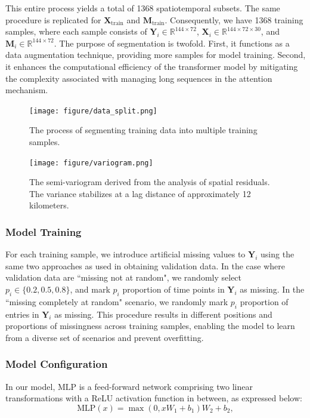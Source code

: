 \documentclass[11pt]{article}
\begin{document}
This entire process yields a total of 1368 spatiotemporal subsets. The same procedure is replicated for $\boldsymbol{X}_{\text{train}}$ and $\boldsymbol{M}_{\text{train}}$. Consequently, we have 1368 training samples, where each sample consists of $\boldsymbol{Y}_i \in \mathbb{R}^{144\times 72}$, $\boldsymbol{X}_i \in \mathbb{R}^{144 \times 72 \times 30}$, and $\boldsymbol{M}_i \in \mathbb{R}^{144 \times 72}$. The purpose of segmentation is twofold. First, it functions as a data augmentation technique, providing more samples for model training. Second, it enhances the computational efficiency of the transformer model by mitigating the complexity associated with managing long sequences in the attention mechanism. 




\begin{figure}
\centering
\texttt{[image: figure/data\_split.png]}
\caption{ The process of segmenting training data into multiple training samples.}
\label{fig: data_split}
\end{figure}

\begin{figure}
\centering
\texttt{[image: figure/variogram.png]}
\caption{The semi-variogram derived from the analysis of spatial residuals. The variance stabilizes at a lag distance of approximately 12 kilometers.}
\label{fig: variogram}
\end{figure}




\subsubsection*{Model Training}
For each training sample, we introduce artificial missing values to $\boldsymbol{Y}_i$ using the same two approaches as used in obtaining validation data. In the case where validation data are ``missing not at random", we randomly select $p_i \in \{0.2, 0.5, 0.8\}$, and mark $p_i$ proportion of time points in $\boldsymbol{Y}_i$ as missing. In the ``missing completely at random" scenario, we randomly mark $p_i$ proportion of entries in $\boldsymbol{Y}_i$ as missing. This procedure results in different positions and proportions of missingness across training samples, enabling the model to learn from a diverse set of scenarios and prevent overfitting.



\subsubsection*{Model Configuration}
In our model, $\text{MLP}$ is a feed-forward network comprising two linear transformations with a ReLU activation function in between, as expressed below:
\begin{equation}
    \text{MLP}(x)= \max (0, xW_1+b_1)W_2+b_2,
\end{equation}
\end{document}
